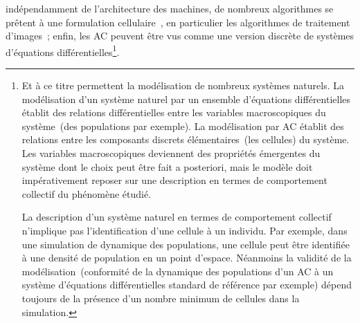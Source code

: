 ind\'ependamment de l'architecture des machines, de nombreux
algorithmes se pr\^etent \`a une formulation
cellulaire~\cite[]{Uhr87,Uhr84}, en particulier les algorithmes de
traitement d'images~\cite[]{Preston84,Hasselbring92}; enfin, les AC
peuvent \^etre vus comme une version discr\`ete de syst\`emes
d'\'equations diff\'erentielles\footnote{%
  Et \`a ce titre permettent la mod\'elisation de nombreux syst\`emes
  naturels. %
  La mod\'elisation d'un syst\`eme naturel par un ensemble d'\'equations
  diff\'erentielles \'etablit des relations diff\'erentielles entre les
  variables macroscopiques du syst\`eme~(des populations par exemple). %
  La mod\'elisation par AC \'etablit des relations entre les composants
  discrets \'el\'ementaires~(les cellules) du syst\`eme. %
  Les variables macroscopiques deviennent des propri\'et\'es \'emergentes du
  syst\`eme dont le choix peut \^etre fait a posteriori, mais le mod\`ele
  doit imp\'erativement reposer sur une description en termes de
  comportement collectif du ph\'enom\`ene \'etudi\'e. %

  La description d'un syst\`eme naturel en termes de comportement
  collectif n'implique pas l'identification d'une cellule \`a un
  individu. %
  Par exemple, dans une simulation de dynamique des populations, une
  cellule peut \^etre identifi\'ee \`a une densit\'e de population en un point
  d'espace. %
  N\'eanmoins la validit\'e de la mod\'elisation~(conformit\'e de la dynamique
  des populations d'un AC \`a un syst\`eme d'\'equations diff\'erentielles
  standard de r\'ef\'erence par exemple) d\'epend toujours de la pr\'esence
  d'un nombre minimum de cellules dans la simulation.}. %





